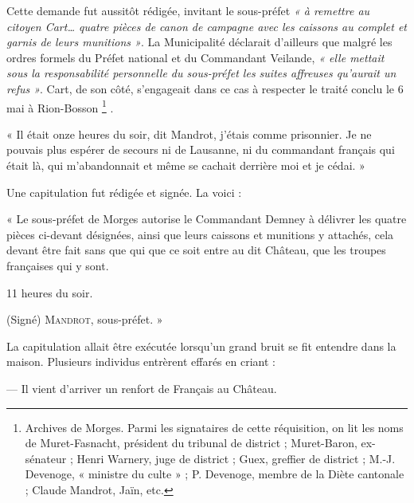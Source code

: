 \documentclass[french,twoside]{book} %
\newenvironment{quoteblock}%
  {\begin{quoting}}
  {\end{quoting}}
\newenvironment{quotebar}{%
    \def\FrameCommand{{\color{rubric!10!}\vrule width 0.5em} \hspace{0.9em}}%
    \def\OuterFrameSep{\itemsep} %
    \MakeFramed {\advance\hsize-\width \FrameRestore}
  }%
  {%
    \endMakeFramed
  }
\renewenvironment{quoteblock}%
  {%
    \savenotes
    \setstretch{0.9}
    \begin{quotebar}
  }
  {%
    \end{quotebar}
    \spewnotes
  }
\begin{document}
\noindent Cette demande fut aussitôt rédigée, invitant le sous-préfet \emph{« à remettre au citoyen Cart… quatre pièces de canon de campagne avec les caissons au complet et garnis de leurs munitions »}. La Municipalité déclarait d’ailleurs que malgré les ordres formels du Préfet national et du Commandant Veilande, \emph{« elle mettait sous la responsabilité personnelle du sous-préfet les suites affreuses qu’aurait un refus »}. Cart, de son côté, s’engageait dans ce cas à respecter le traité conclu le 6 mai à Rion-Bosson \footnote{Archives de Morges. Parmi les signataires de cette réquisition, on lit les noms de Muret-Fasnacht, président du tribunal de district ; Muret-Baron, ex-sénateur ; Henri Warnery, juge de district ; Guex, greffier de district ; M.-J. Devenoge, « ministre du culte » ; P. Devenoge, membre de la Diète cantonale ; Claude Mandrot, Jaïn, etc.} .\par

\begin{quoteblock}
 \noindent « Il était onze heures du soir, dit Mandrot, j’étais comme prisonnier. Je ne pouvais plus espérer de secours ni de Lausanne, ni du commandant français qui était là, qui m’abandonnait et même se cachait derrière moi et je cédai. »
 \end{quoteblock}

\noindent Une capitulation fut rédigée et signée. La voici :\par

\begin{quoteblock}
 \noindent « Le sous-préfet de Morges autorise le Commandant Demney à délivrer les quatre pièces ci-devant désignées, ainsi que leurs caissons et munitions y attachés, cela devant être fait sans que qui que ce soit entre au dit Château, que les troupes françaises qui y sont.\par
 11 heures du soir.\par
 (Signé) {\scshape Mandrot}, sous-préfet. »
 \end{quoteblock}

\noindent La capitulation allait être exécutée lorsqu’un grand bruit se fit entendre dans la maison. Plusieurs individus entrèrent effarés en criant :\par
— Il vient d’arriver un renfort de Français au Château.\par
\end{document}
